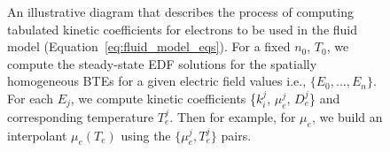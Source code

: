 \begin{figure}[!tbhp]
	\centering
\caption{An illustrative diagram that describes the process of computing tabulated kinetic coefficients for electrons to be used in the fluid model (Equation~\ref{eq:fluid_model_eqs}). For a fixed $n_0$, $T_0$, we compute the steady-state EDF solutions for the spatially homogeneous BTEs for a given electric field values i.e., $\{E_0,...,E_n\}$. For each $E_j$, we compute kinetic coefficients \{$k_i^j$, $\mu_e^j$, $D_e^j$\} and corresponding temperature $T_e^j$. Then for example, for $\mu_e$, we build an interpolant $\mu_e(T_e)$ using the $\{\mu_e^j, T_e^j\}$ pairs. 
\label{fig:tab_kinetics_process} 
}
\end{figure}

